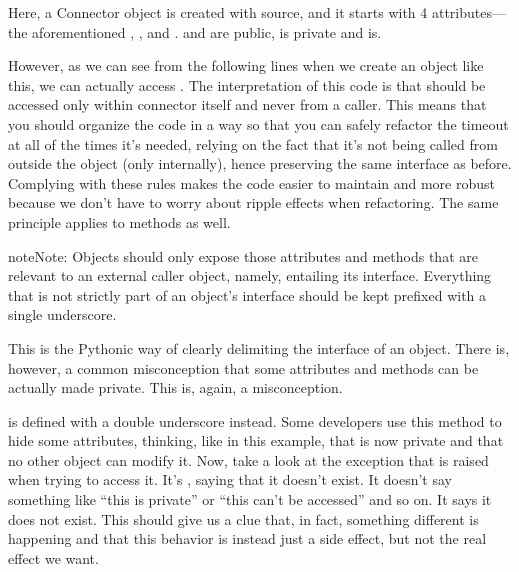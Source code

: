 \documentclass[a4paper,10pt,english]{sphinxmanual}
\begin{document}
Here, a Connector object is created with source, and it starts with 4 attributes—the
aforementioned , ,  and .  and  are public,  is
private and  is.

However, as we can see from the following lines when we create an object like this, we can actually access .
The interpretation of this code is that  should be accessed only within connector itself and never from a
caller. This means that you should organize the code in a way so that you can safely refactor the timeout at all of the
times it’s needed, relying on the fact that it’s not being called from outside the object (only internally), hence
preserving the same interface as before. Complying with these rules makes the code easier to maintain and more
robust because we don’t have to worry about ripple effects when refactoring. The same principle applies to methods as
well.

\begin{sphinxadmonition}{note}{Note:}
Objects should only expose those attributes and methods that are relevant to an external caller object,
namely, entailing its interface. Everything that is not strictly part of an object’s interface should be kept prefixed
with a single underscore.
\end{sphinxadmonition}

This is the Pythonic way of clearly delimiting the interface of an object. There is, however, a common misconception
that some attributes and methods can be actually made private. This is, again, a misconception.

 is defined with a double underscore instead. Some developers use this method to hide some attributes,
thinking, like in this example, that  is now private and that no other object can modify it. Now, take a
look at the exception that is raised when trying to access it. It’s , saying that it doesn’t exist.
It doesn’t say something like “this is private” or “this can’t be accessed” and so on. It says it does not exist. This
should give us a clue that, in fact, something different is happening and that this behavior is instead just a side
effect, but not the real effect we want.
\end{document}
